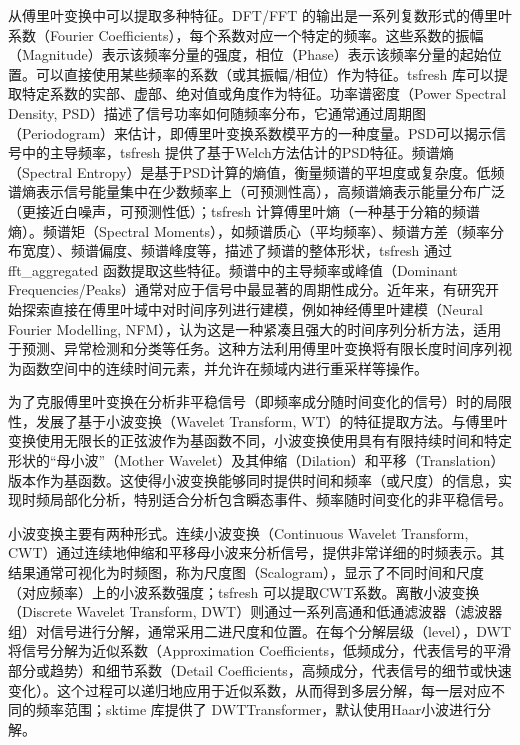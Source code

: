 从傅里叶变换中可以提取多种特征。DFT/FFT 的输出是一系列复数形式的傅里叶系数（Fourier Coefficients），每个系数对应一个特定的频率。这些系数的振幅（Magnitude）表示该频率分量的强度，相位（Phase）表示该频率分量的起始位置。可以直接使用某些频率的系数（或其振幅/相位）作为特征。tsfresh 库可以提取特定系数的实部、虚部、绝对值或角度作为特征。功率谱密度（Power Spectral Density, PSD）描述了信号功率如何随频率分布，它通常通过周期图（Periodogram）来估计，即傅里叶变换系数模平方的一种度量。PSD可以揭示信号中的主导频率，tsfresh 提供了基于Welch方法估计的PSD特征。频谱熵（Spectral Entropy）是基于PSD计算的熵值，衡量频谱的平坦度或复杂度。低频谱熵表示信号能量集中在少数频率上（可预测性高），高频谱熵表示能量分布广泛（更接近白噪声，可预测性低）；tsfresh 计算傅里叶熵（一种基于分箱的频谱熵）。频谱矩（Spectral Moments），如频谱质心（平均频率）、频谱方差（频率分布宽度）、频谱偏度、频谱峰度等，描述了频谱的整体形状，tsfresh 通过 fft\_aggregated 函数提取这些特征。频谱中的主导频率或峰值（Dominant Frequencies/Peaks）通常对应于信号中最显著的周期性成分。近年来，有研究开始探索直接在傅里叶域中对时间序列进行建模，例如神经傅里叶建模（Neural Fourier Modelling, NFM），认为这是一种紧凑且强大的时间序列分析方法，适用于预测、异常检测和分类等任务。这种方法利用傅里叶变换将有限长度时间序列视为函数空间中的连续时间元素，并允许在频域内进行重采样等操作。

为了克服傅里叶变换在分析非平稳信号（即频率成分随时间变化的信号）时的局限性，发展了基于小波变换（Wavelet Transform, WT）的特征提取方法。与傅里叶变换使用无限长的正弦波作为基函数不同，小波变换使用具有有限持续时间和特定形状的“母小波”（Mother Wavelet）及其伸缩（Dilation）和平移（Translation）版本作为基函数。这使得小波变换能够同时提供时间和频率（或尺度）的信息，实现时频局部化分析，特别适合分析包含瞬态事件、频率随时间变化的非平稳信号。

小波变换\cite{rhif2019wavelet}主要有两种形式。连续小波变换（Continuous Wavelet Transform, CWT）通过连续地伸缩和平移母小波来分析信号，提供非常详细的时频表示。其结果通常可视化为时频图，称为尺度图（Scalogram），显示了不同时间和尺度（对应频率）上的小波系数强度；tsfresh 可以提取CWT系数。离散小波变换（Discrete Wavelet Transform, DWT）则通过一系列高通和低通滤波器（滤波器组）对信号进行分解，通常采用二进尺度和位置。在每个分解层级（level），DWT将信号分解为近似系数（Approximation Coefficients，低频成分，代表信号的平滑部分或趋势）和细节系数（Detail Coefficients，高频成分，代表信号的细节或快速变化）。这个过程可以递归地应用于近似系数，从而得到多层分解，每一层对应不同的频率范围；sktime 库\cite{loning2019sktime}提供了 DWTTransformer，默认使用Haar小波进行分解。


